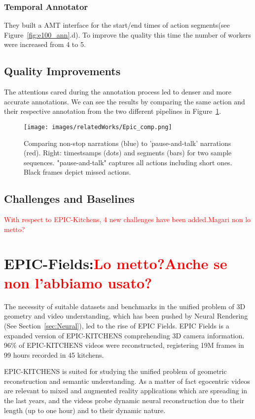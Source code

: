 \subsubsection{Temporal Annotator}
They built a AMT interface for the start/end times of action segments(see Figure~\ref{fig:e100_ann}.d).
To improve the quality this time the number of workers were increased from 4 to 5.

\subsection{Quality Improvements}
The attentions cared during the annotation process led to denser and more accurate annotations.
We can see the results by comparing the same action and their respective annotation from the
two different pipelines in Figure~\ref{fig:ep100_comp}.

\begin{figure}
    \centering
    \texttt{[image: images/relatedWorks/Epic\_comp.png]} 
    \caption{Comparing non-stop narrations (blue) to 'pause-and-talk' narrations (red).
    Right: timestsamps (dots) and segments (bars) for two sample sequences. "pause-and-talk"
    captures all actions including short ones. Black frames depict missed actions.}\label{fig:ep100_comp}
\end{figure}

\subsection{Challenges and Baselines}
\textcolor{red}{With respect to EPIC-Kitchens, 4 new challenges have 
been added.Magari non lo metto? }

\section{EPIC-Fields:\textcolor{red}{Lo metto?Anche se non l'abbiamo usato?}}
The necessity of suitable datasets and benchmarks in the unified problem of 3D geometry and video understanding, which has been
pushed by Neural Rendering (See Section~\ref{sec:Neural}), led to the rise of EPIC Fields. EPIC Fields is a expanded version of 
EPIC-KITCHENS comprehending 3D camera information. 96\% of EPIC-KITCHENS videos were reconstructed, registering 19M frames in 
99 hours recorded in 45 kitchens.

EPIC-KITCHENS is suited for studying the unified problem of geometric reconstruction and semantic understanding. As a matter
of fact egocentric videos  are relevant to mixed and augmented reality applications which are spreading in the last years, and 
the videos probe dynamic neural reconstruction due to their length (up to one hour) and to their dynamic nature.


